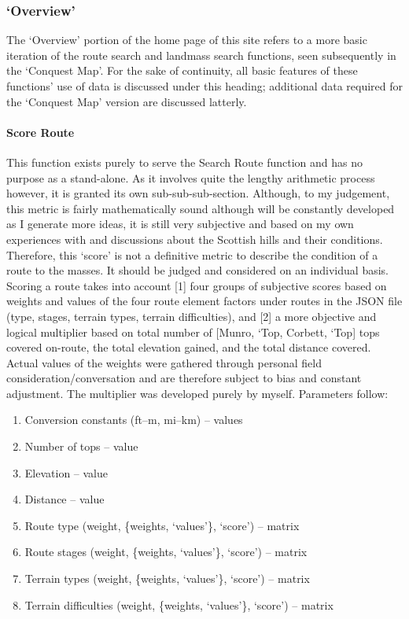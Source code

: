 \documentclass[11pt, english]{article}
\begin{document}
		\subsubsection{`Overview'}

	The `Overview' portion of the home page of this site refers to a more basic iteration of the route search and landmass search functions, seen subsequently in the `Conquest Map'. For the sake of continuity, all basic features of these functions' use of data is discussed under this heading; additional data required for the `Conquest Map' version are discussed latterly.

			\paragraph{Score Route}

	This function exists purely to serve the Search Route function and has no purpose as a stand-alone. As it involves quite the lengthy arithmetic process however, it is granted its own sub-sub-sub-section. Although, to my judgement, this metric is fairly mathematically sound although will be constantly developed as I generate more ideas, it is still very subjective and based on my own experiences with and discussions about the Scottish hills and their conditions. Therefore, this `score' is not a definitive metric to describe the condition of a route to the masses. It should be judged and considered on an individual basis.\\

	Scoring a route takes into account [1] four groups of subjective scores based on weights and values of the four route element factors under routes in the JSON file (type, stages, terrain types, terrain difficulties), and [2] a more objective and logical multiplier based on total number of [Munro, `Top, Corbett, `Top] tops covered on-route, the total elevation gained, and the total distance covered. Actual values of the weights were gathered through personal field consideration/conversation and are therefore subject to bias and constant adjustment. The multiplier was developed purely by myself. Parameters follow:

	\begin{enumerate}
	\setlength\itemsep{0cm}
		\item Conversion constants (ft--m, mi--km) -- values
		\item Number of tops -- value
		\item Elevation -- value
		\item Distance -- value
		\item Route type (weight, \{weights, `values'\}, `score') -- matrix
		\item Route stages (weight, \{weights, `values'\}, `score') -- matrix
		\item Terrain types (weight, \{weights, `values'\}, `score') -- matrix
		\item Terrain difficulties (weight, \{weights, `values'\}, `score') -- matrix
	\end{enumerate}
\end{document}
